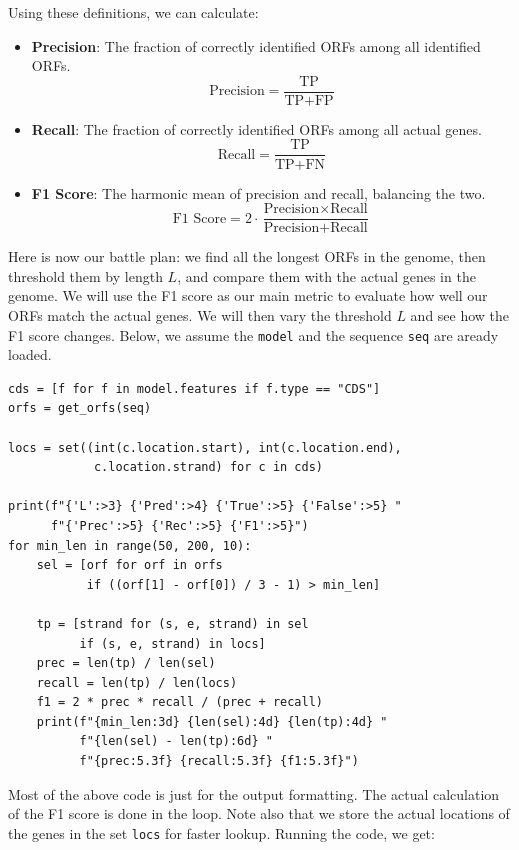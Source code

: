 Using these definitions, we can calculate:

\begin{itemize}
    \item \textbf{Precision}: The fraction of correctly identified ORFs among all identified ORFs.
    \[
    \text{Precision} = \frac{\text{TP}}{\text{TP} + \text{FP}}
    \]
    
    \item \textbf{Recall}: The fraction of correctly identified ORFs among all actual genes.
    \[
    \text{Recall} = \frac{\text{TP}}{\text{TP} + \text{FN}}
    \]
    
    \item \textbf{F1 Score}: The harmonic mean of precision and recall, balancing the two.
    \[
    \text{F1 Score} = 2 \cdot \frac{\text{Precision} \times \text{Recall}}{\text{Precision} + \text{Recall}}
    \]
\end{itemize}

Here is now our battle plan: we find all the longest ORFs in the genome, then threshold them by length $L$, and compare them with the actual genes in the genome. We will use the F1 score as our main metric to evaluate how well our ORFs match the actual genes. We will then vary the threshold $L$ and see how the F1 score changes. Below, we assume the \texttt{model} and the sequence \texttt{seq} are aready loaded.

\vspace*{3mm}
\begin{lstlisting}
cds = [f for f in model.features if f.type == "CDS"]
orfs = get_orfs(seq)

locs = set((int(c.location.start), int(c.location.end),
            c.location.strand) for c in cds)

print(f"{'L':>3} {'Pred':>4} {'True':>5} {'False':>5} "
      f"{'Prec':>5} {'Rec':>5} {'F1':>5}")
for min_len in range(50, 200, 10):
    sel = [orf for orf in orfs 
           if ((orf[1] - orf[0]) / 3 - 1) > min_len]

    tp = [strand for (s, e, strand) in sel 
          if (s, e, strand) in locs]
    prec = len(tp) / len(sel)
    recall = len(tp) / len(locs)
    f1 = 2 * prec * recall / (prec + recall)
    print(f"{min_len:3d} {len(sel):4d} {len(tp):4d} "
          f"{len(sel) - len(tp):6d} "
          f"{prec:5.3f} {recall:5.3f} {f1:5.3f}")
\end{lstlisting}

Most of the above code is just for the output formatting. The actual calculation of the F1 score is done in the loop. Note also that we store the actual locations of the genes in the set \texttt{locs} for faster lookup. Running the code, we get:

